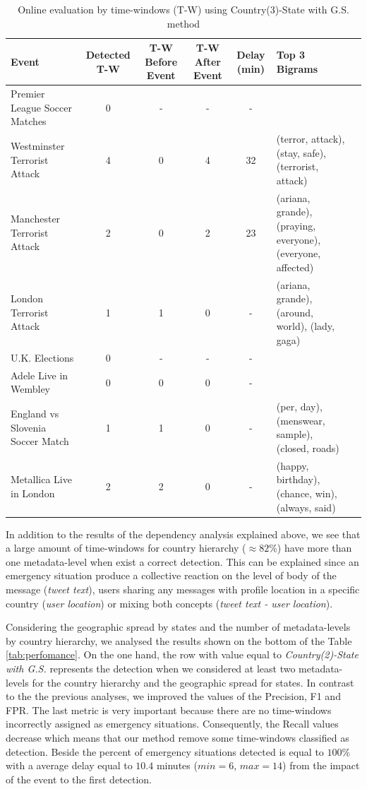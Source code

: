 \documentclass[sigconf]{acmart}
\begin{document}
\begin{table}
	\caption{Online evaluation by time-windows (T-W) using Country(3)-State with G.S. method}
	\label{tab:online2}
	\begin{tabular}{lccccp{3.5cm}c}
		\toprule
		Event &Detected T-W & T-W Before Event & T-W After Event & Delay (min) & Top 3 Bigrams\\
		\midrule
		Premier League Soccer Matches & 0& - & - & - & \hfill \break \\
		Westminster Terrorist Attack& 4 & 0 &4 & 32& \small{(terror, attack), (stay, safe), (terrorist, attack)}\\
		Manchester Terrorist Attack& 2& 0& 2& 23& \small{(ariana, grande), (praying, everyone), (everyone, affected)}\\
		London Terrorist Attack & 1 & 1 & 0 & - & \small{(ariana, grande), (around, world), (lady, gaga)} \\
		U.K. Elections& 0 & - & - & - & \hfill \break\\
		Adele Live in Wembley& 0& 0&0&-& \hfill \break\\
		England vs Slovenia Soccer Match & 1& 1 & 0 & - & \small{(per, day), (menswear, sample), (closed, roads)}\\
		Metallica Live in London& 2 & 2 & 0 & - & \small{(happy, birthday), (chance, win), (always, said)}\\
		\bottomrule
	\end{tabular}
\end{table}


In addition to the results of the dependency analysis explained above, we see that a large amount of time-windows for country hierarchy ($\approx 82\%$) have more than one metadata-level when exist a correct detection. This can be explained since an emergency situation produce a collective reaction on the level of body of the message (\textit{tweet text}), users sharing any messages with profile location in a specific country (\textit{user location}) or mixing both concepts (\textit{tweet text - user location}).


Considering the geographic spread by states and the number of metadata-levels by country hierarchy, we analysed the results shown on the bottom of the Table \ref{tab:perfomance}. On the one hand, the row with value equal to \textit{Country(2)-State with G.S.} represents the detection when we considered at least two metadata-levels for the country hierarchy and the geographic spread for states. In contrast to the the previous analyses, we improved the values of the Precision, F1 and FPR. The last metric is very important because there are no time-windows incorrectly assigned as emergency situations. Consequently, the Recall values decrease which means that our method remove some time-windows classified as detection. Beside the percent of emergency situations detected is equal to $100\%$ with a average delay equal to $10.4$ minutes ($min=6$, $max=14$) from the impact of the event to the first detection.
\end{document}
